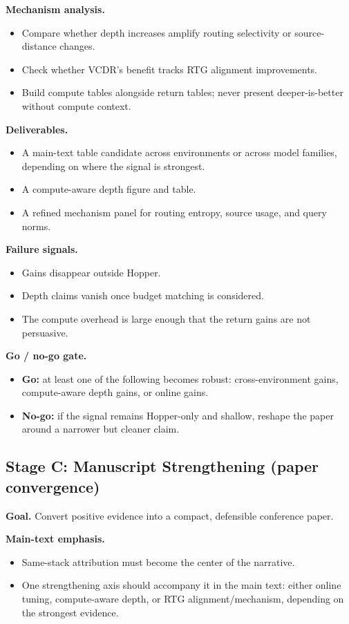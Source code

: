 \documentclass[11pt]{article}
\begin{document}
\textbf{Mechanism analysis.}
\begin{itemize}
  \item Compare whether depth increases amplify routing selectivity or source-distance changes.
  \item Check whether VCDR's benefit tracks RTG alignment improvements.
  \item Build compute tables alongside return tables; never present deeper-is-better without compute context.
\end{itemize}

\textbf{Deliverables.}
\begin{itemize}
  \item A main-text table candidate across environments or across model families, depending on where the signal is strongest.
  \item A compute-aware depth figure and table.
  \item A refined mechanism panel for routing entropy, source usage, and query norms.
\end{itemize}

\textbf{Failure signals.}
\begin{itemize}
  \item Gains disappear outside Hopper.
  \item Depth claims vanish once budget matching is considered.
  \item The compute overhead is large enough that the return gains are not persuasive.
\end{itemize}

\textbf{Go / no-go gate.}
\begin{itemize}
  \item \textbf{Go:} at least one of the following becomes robust: cross-environment gains, compute-aware depth gains, or online gains.
  \item \textbf{No-go:} if the signal remains Hopper-only and shallow, reshape the paper around a narrower but cleaner claim.
\end{itemize}

\subsection*{Stage C: Manuscript Strengthening (paper convergence)}

\textbf{Goal.} Convert positive evidence into a compact, defensible conference paper.

\textbf{Main-text emphasis.}
\begin{itemize}
  \item Same-stack attribution must become the center of the narrative.
  \item One strengthening axis should accompany it in the main text: either online tuning, compute-aware depth, or RTG alignment/mechanism, depending on the strongest evidence.
\end{itemize}
\end{document}
